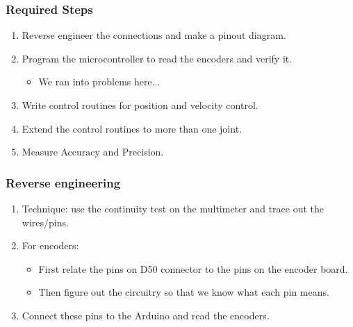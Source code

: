 \documentclass{beamer}
\begin{document}
  
  \begin{frame}

    \frametitle{Required Steps}
    \begin{enumerate}
    \item<1-> Reverse engineer the connections and make a pinout
      diagram.
    \item<2-> Program the microcontroller to read the encoders and verify it.
      \begin{itemize}
      \item<2-> We ran into problems here...
      \end{itemize}
    \item<3-> Write control routines for position and velocity control.
    \item<4-> Extend the control routines to more than one joint.
    \item<5-> Measure Accuracy and Precision.
    \end{enumerate}
  \end{frame}
  
  \begin{frame}
    \frametitle{Reverse engineering}
    \begin{enumerate}
      \item<1-> Technique: use the continuity test on the multimeter
        and trace out the wires/pins. 
      \item<2-> For encoders:
        \begin{itemize}
          \item<2-> First relate the pins on D50 connector to the pins
            on the encoder board.
          \item<3-> Then figure out the circuitry so that we know
            what each pin means.
        \end{itemize}
      \item<4-> Connect these pins to the Arduino and read the
        encoders. 
    \end{enumerate}
  \end{frame}
\end{document}
